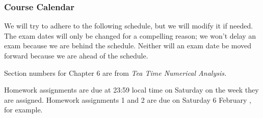 \documentclass[12pt,fullpage]{article}
\newcounter{ex}\setcounter{ex}{0}
\begin{document}
\newpage

\subsubsection*{Course Calendar}

We will try to adhere to the following schedule, but we will modify it
if needed. The exam dates will only be changed for a compelling
reason; we won't delay an exam because we are behind the
schedule. Neither will an exam date be moved forward because we are
ahead of the schedule.

Section numbers for Chapter 6 are from \emph{Tea Time Numerical Analysis.}  

Homework assignments are due at 23:59 local time on Saturday on the week they are assigned. Homework assignments 1 and 2 are due on Saturday 6 February \the\year, for example.

\vspace{0.1in}
\end{document}
